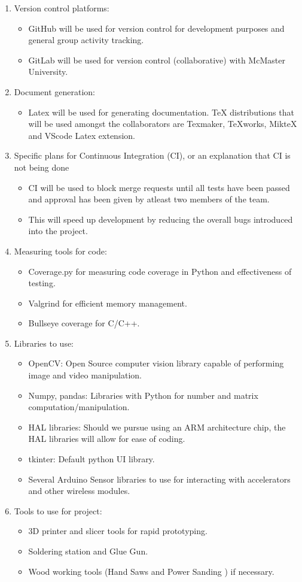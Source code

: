 \documentclass[12pt]{article}
\begin{document}
\begin{enumerate}
\item Version control platforms:
\begin{itemize}
\item GitHub will be used for version control for development purposes and general group activity tracking.
\item GitLab will be used for version control (collaborative) with McMaster University.
\end{itemize}
\item Document generation:
\begin{itemize}
\item Latex will be used for generating documentation. TeX distributions that will be used amongst the collaborators are  Texmaker, TeXworks, MikteX and VScode Latex extension.
\end{itemize}
\item Specific plans for Continuous Integration (CI), or an explanation that CI
  is not being done
\begin{itemize}
\item CI will be used to block merge requests until all tests have been passed and approval has been given by atleast two members of the team. 
\item This will speed up development by reducing the overall bugs introduced into the project.
\end{itemize}
\item Measuring tools for code:
\begin{itemize}
\item Coverage.py for measuring code coverage in Python and effectiveness of testing.
\item Valgrind for efficient memory management.
\item Bullseye coverage for C/C++.
\end{itemize}
\item Libraries to use:
\begin{itemize}
\item OpenCV: Open Source computer vision library capable of performing image and video manipulation.
\item Numpy, pandas: Libraries with Python for number and matrix computation/manipulation.
\item HAL libraries: Should we pursue using an ARM architecture chip, the HAL libraries will allow for ease of coding.
\item tkinter: Default python UI library.
\item Several Arduino Sensor libraries to use for interacting with accelerators and other wireless modules.
\end{itemize}
\item Tools to use for project:
\begin{itemize}
\item 3D printer and slicer tools for rapid prototyping.
\item Soldering station and Glue Gun.
\item Wood working tools (Hand Saws and Power Sanding ) if necessary.
\end{itemize}
\end{enumerate}
\end{document}
